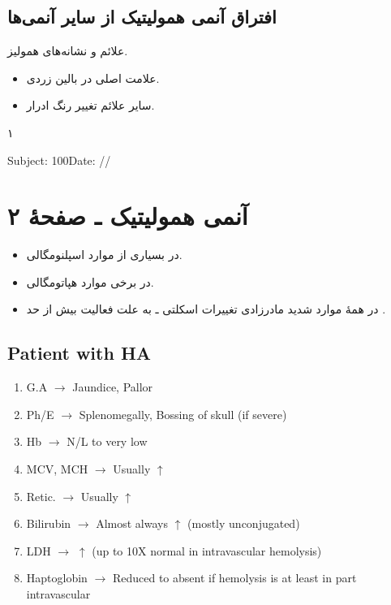 \documentclass[11pt,a4paper]{article}
\begin{document}
\subsection*{افتراق آنمی همولیتیک از سایر آنمی‌ها}
علائم و نشانه‌های همولیز.
\begin{itemize}
\item علامت اصلی در بالین \HemolyticArrow{} زردی.
\item سایر علائم \HemolyticArrow{} تغییر رنگ ادرار.
\end{itemize}
\vfill
\begin{center}\qquad ۱\end{center}

\clearpage
\begin{latin}
Subject: 100\hfill Date: /\quad/
\end{latin}
\section*{آنمی همولیتیک ـ صفحهٔ ۲}
\begin{itemize}
\item در بسیاری از موارد  \HemolyticArrow{} اسپلنومگالی.
\item در برخی موارد  \HemolyticArrow{} هپاتومگالی.
\item در همهٔ موارد  شدید مادرزادی \HemolyticArrow{}
تغییرات اسکلتی ـ به علت فعالیت بیش از حد .
\end{itemize}

\begin{latin}
\subsection*{Patient with HA}
\begin{enumerate}
\renewcommand{\labelenumi}{\alph{enumi})}
\item G.A $\longrightarrow$ Jaundice, Pallor
\item Ph/E $\longrightarrow$ Splenomegally, Bossing of skull (if severe)
\item Hb $\longrightarrow$ N/L to very low
\item MCV, MCH $\longrightarrow$ Usually $\uparrow$
\item Retic. $\longrightarrow$ Usually $\uparrow$
\item Bilirubin $\longrightarrow$ Almost always $\uparrow$ (mostly unconjugated)
\item LDH $\longrightarrow$ $\uparrow$ (up to 10X normal in intravascular hemolysis)
\item Haptoglobin $\longrightarrow$ Reduced to absent if hemolysis is at least in part intravascular
\end{enumerate}
\end{latin}
\end{document}
